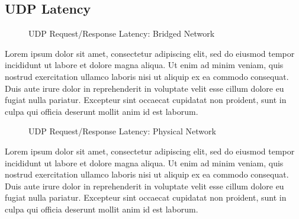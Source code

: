 \subsection{UDP Latency} %
\label{sub:udplatency}
\begin{figure}
    \centering
    \def\svgwidth{\columnwidth}
    
    \caption{UDP Request/Response Latency: Bridged Network}
    \label{fig:udp_rr_bridge}
\end{figure}
Lorem ipsum dolor sit amet, consectetur adipiscing elit, sed do eiusmod tempor incididunt ut labore et dolore magna aliqua. Ut enim ad minim veniam, quis nostrud exercitation ullamco laboris nisi ut aliquip ex ea commodo consequat. Duis aute irure dolor in reprehenderit in voluptate velit esse cillum dolore eu fugiat nulla pariatur. Excepteur sint occaecat cupidatat non proident, sunt in culpa qui officia deserunt mollit anim id est laborum.
\begin{figure}
    \centering
    \def\svgwidth{\columnwidth}
    
    \caption{UDP Request/Response Latency: Physical Network}
    \label{fig:udp_rr_phys}
\end{figure}
Lorem ipsum dolor sit amet, consectetur adipiscing elit, sed do eiusmod tempor incididunt ut labore et dolore magna aliqua. Ut enim ad minim veniam, quis nostrud exercitation ullamco laboris nisi ut aliquip ex ea commodo consequat. Duis aute irure dolor in reprehenderit in voluptate velit esse cillum dolore eu fugiat nulla pariatur. Excepteur sint occaecat cupidatat non proident, sunt in culpa qui officia deserunt mollit anim id est laborum.

